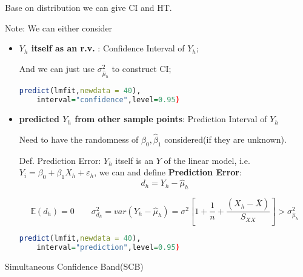     Base on distribution we can give CI and HT.

    Note: We can either consider 
    \begin{itemize}[topsep=2pt,itemsep=2pt]
        \item \textbf{$ Y_h $ itself as an r.v. }: Confidence Interval of $ Y_h $;
        
        And we can just use $  \sigma ^2_{\hat{\mu}_h} $ to construct CI;

        \begin{rcode}
\begin{lstlisting}[language=R]
predict(lmfit,newdata = 40),
    interval="confidence",level=0.95)
\end{lstlisting}
        \end{rcode}
        \item \textbf{predicted $ Y_h $ from other sample points}: Prediction Interval of $ Y_h $
        
        Need to  have the randomness of $ \hat{\beta }_0,\hat{\beta }_1 $ considered(if they are unknown).

        Def. Prediction Error: $ Y_h $ itself is an $ Y $ of the linear model, i.e. $ Y_i=\beta_0+\beta_1X_h+\varepsilon _h $, we can  and define \textbf{Prediction Error}: 
        \begin{equation}
            d_h=Y_h-\hat{\mu}_h 
        \end{equation}
    
        
        \begin{equation}
            \mathbb{E}(d_h)=0\qquad \sigma^2_{d_h}=var(Y_h-\hat{\mu }_h)=\sigma^2\left[ 1+\dfrac{1}{n}+\dfrac{(X_h-\bar{X})}{S_{XX}} \right] > \sigma ^2_{\hat{\mu}_h}
        \end{equation}
\begin{rcode}
\begin{lstlisting}[language=R]
predict(lmfit,newdata = 40),
    interval="prediction",level=0.95)
\end{lstlisting}
\end{rcode}
    
    \end{itemize}
    
    


    \begin{point}
       Simultaneous Confidence Band(SCB)
    \end{point}

